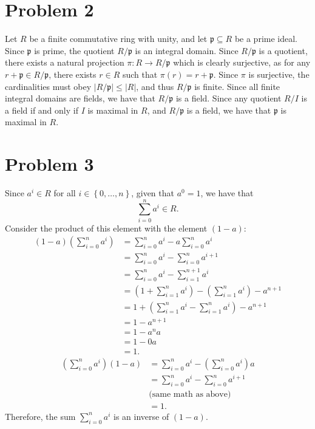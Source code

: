 \documentclass[11pt, letterpaper]{article}
\begin{document}
\section*{Problem 2}
Let $R$ be a finite commutative ring with unity, and let $\mathfrak{p} \subseteq R$ be a prime ideal. Since $\mathfrak{p} $ is prime, the quotient $R/\mathfrak{p} $ is an integral domain. Since $R/\mathfrak{p} $ is a quotient, there exists a natural projection $\pi : R \to R/\mathfrak{p} $ which is clearly surjective, as for any $r+\mathfrak{p} \in R/\mathfrak{p} $, there exists $r\in R$ such that $\pi (r)=r+\mathfrak{p} $. Since $\pi $ is surjective, the cardinalities must obey $\left| R/\mathfrak{p}  \right| \leq \left| R \right| $, and thus $R/\mathfrak{p} $ is finite. Since all finite integral domains are fields, we have that $R/\mathfrak{p} $ is a field. Since any quotient $R/I$ is a field if and only if $I$ is maximal in $R$, and $R/\mathfrak{p} $ is a field, we have that $\mathfrak{p} $ is maximal in $R$.
\section*{Problem 3}
Since $a^i\in R$ for all $i\in \left\{ 0, \ldots , n \right\} $, given that $a^0=1$, we have that
\[
	\sum_{i=0}^{n} a^i\in R
.\]
Consider the product of this element with the element $(1-a)$:
\begin{align*}
	(1-a)\left( \sum_{i=0}^{n} a^i \right) &=\sum_{i=0}^{n} a^i-a \sum_{i=0}^{n} a^i\\
					       &=\sum_{i=0}^{n} a^i-\sum_{i=0}^{n} a^{i+1} \\
					       &=\sum_{i=0}^{n} a^i-\sum_{i=1}^{n+1} a^i\\
					       &=\left(1+\sum_{i=1}^{n} a^i\right)-\left( \sum_{i=1}^{n} a^i \right) -a^{n+1} \\
					       &=1+\left( \sum_{i=1}^{n} a^i-\sum_{i=1}^{n} a^i \right) -a^{n+1} \\
					       &=1-a^{n+1} \\
					       &=1-a^{n} a\\
					       &=1-0a\\
					       &=1
.\end{align*}
\begin{align*}
	\left( \sum_{i=0}^{n} a^i \right) (1-a)&=\sum_{i=0}^{n} a^i-\left( \sum_{i=0}^{n} a^i \right) a\\
					       &=\sum_{i=0}^{n} a^i-\sum_{i=0}^{n} a^{i+1} \\
					       &\text{(same math as above)} \\
					       &=1
.\end{align*}
Therefore, the sum $\sum_{i=0}^{n} a^i$ is an inverse of $(1-a)$.
\end{document}
